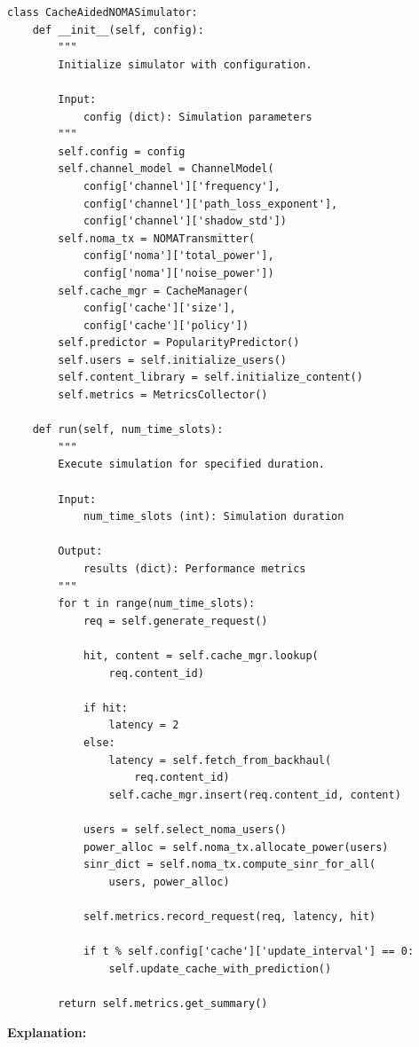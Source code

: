 \documentclass[12pt,a4paper]{article}
\begin{document}
\begin{verbatim}
class CacheAidedNOMASimulator:
    def __init__(self, config):
        """
        Initialize simulator with configuration.
        
        Input:
            config (dict): Simulation parameters
        """
        self.config = config
        self.channel_model = ChannelModel(
            config['channel']['frequency'],
            config['channel']['path_loss_exponent'],
            config['channel']['shadow_std'])
        self.noma_tx = NOMATransmitter(
            config['noma']['total_power'],
            config['noma']['noise_power'])
        self.cache_mgr = CacheManager(
            config['cache']['size'],
            config['cache']['policy'])
        self.predictor = PopularityPredictor()
        self.users = self.initialize_users()
        self.content_library = self.initialize_content()
        self.metrics = MetricsCollector()
    
    def run(self, num_time_slots):
        """
        Execute simulation for specified duration.
        
        Input:
            num_time_slots (int): Simulation duration
        
        Output:
            results (dict): Performance metrics
        """
        for t in range(num_time_slots):
            req = self.generate_request()
            
            hit, content = self.cache_mgr.lookup(
                req.content_id)
            
            if hit:
                latency = 2
            else:
                latency = self.fetch_from_backhaul(
                    req.content_id)
                self.cache_mgr.insert(req.content_id, content)
            
            users = self.select_noma_users()
            power_alloc = self.noma_tx.allocate_power(users)
            sinr_dict = self.noma_tx.compute_sinr_for_all(
                users, power_alloc)
            
            self.metrics.record_request(req, latency, hit)
            
            if t % self.config['cache']['update_interval'] == 0:
                self.update_cache_with_prediction()
        
        return self.metrics.get_summary()
\end{verbatim}

\textbf{Explanation:}
\end{document}
